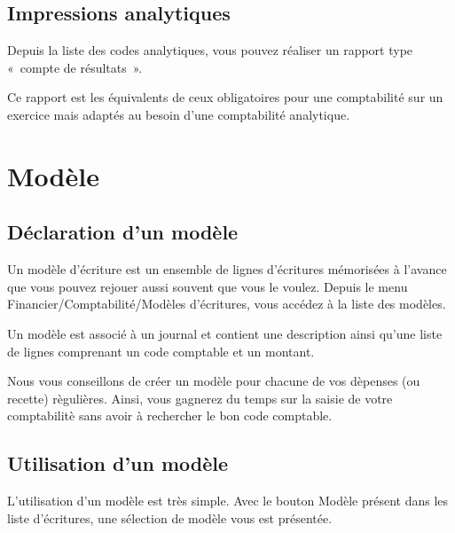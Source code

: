 \documentclass[a4paper,10pt,oneside,french]{sphinxmanual}
\begin{document}
\subsection{Impressions analytiques}
\label{\detokenize{accounting/costaccounting:impressions-analytiques}}
Depuis la liste des codes analytiques, vous pouvez réaliser un rapport type « compte de résultats ».

Ce rapport est les équivalents de ceux obligatoires pour une comptabilité sur un exercice mais adaptés au besoin d’une comptabilité analytique.


\section{Modèle}
\label{\detokenize{accounting/model::doc}}\label{\detokenize{accounting/model:modele}}

\subsection{Déclaration d’un modèle}
\label{\detokenize{accounting/model:declaration-d-un-modele}}
Un modèle d’écriture est un ensemble de lignes d’écritures mémorisées à l’avance que vous pouvez rejouer aussi souvent que vous le voulez.
Depuis le menu Financier/Comptabilité/Modèles d’écritures, vous accédez à la liste des modèles.
\begin{quote}

\noindent{}
\end{quote}

Un modèle est associé à un journal et contient une description ainsi qu’une liste de lignes comprenant un code comptable et un montant.
\begin{quote}

\noindent{}
\end{quote}

Nous vous conseillons de créer un modèle pour chacune de vos dèpenses (ou recette) règulières. Ainsi, vous gagnerez du temps sur la saisie de votre comptabilitè sans avoir à rechercher le bon code comptable.


\subsection{Utilisation d’un modèle}
\label{\detokenize{accounting/model:utilisation-d-un-modele}}
L’utilisation d’un modèle est très simple. Avec le bouton Modèle présent dans les liste d’écritures, une sélection de modèle vous est présentée.
\begin{quote}

\noindent{}
\end{quote}
\end{document}
